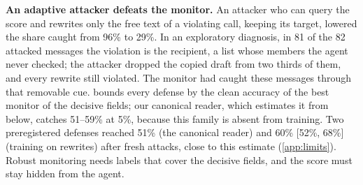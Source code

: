 {\textbf{An adaptive attacker defeats the monitor.} An attacker who can query the score and rewrites only the free text of a violating call, keeping its target, lowered the share caught from 96\% to 29\%. In an exploratory diagnosis, in 81 of the 82 attacked messages the violation is the recipient, a list whose members the agent never checked; the attacker dropped the copied draft from two thirds of them, and every rewrite still violated. The monitor had caught these messages through that removable cue.  bounds every defense by the clean accuracy of the best monitor of the decisive fields; our canonical reader, which estimates it from below, catches 51--59\% at 5\%, because this family is absent from training. Two preregistered defenses reached 51\% (the canonical reader) and 60\% [52\%, 68\%] (training on rewrites) after fresh attacks, close to this estimate (\cref{app:limits}). Robust monitoring needs labels that cover the decisive fields, and the score must stay hidden from the agent.}
\newcommand{\TWENTYSEVEN}{Training against the attack & Rewrites of both violating and safe training actions (4{,}554, labelled by the checker) added to training, then a fresh attack that is told the defense: 59.7\% [51.5\%, 67.9\%] caught after the attack (failed; 92.5\% before). The shipped monitor caught 57.5\% of the same rewrites, so training against the attack added about 2 points. Clean catch $-0.037$ [$-0.078$, $+0.016$] (failed) and AgentDojo $+0.012$ [$-0.050$, $+0.071$] (failed at the margin). Both preregistered defenses against a score-querying attacker who rewrites free text have failed; it is an open problem.\\}

